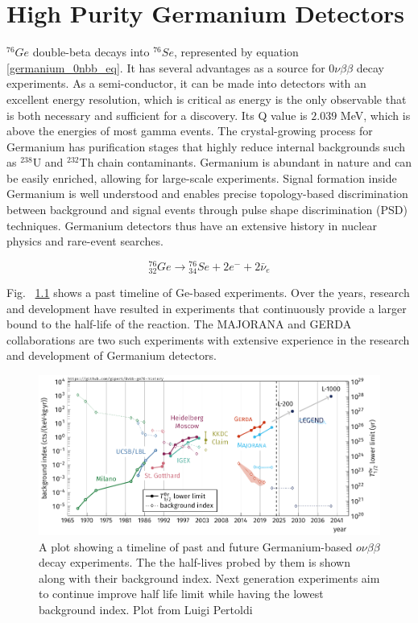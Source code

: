 \chapter{High Purity Germanium Detectors}
\label{chap:detectors}

${}^{76}Ge$ double-beta decays into ${}^{76}Se$, represented by equation \ref{germanium_0nbb_eq}. It has several advantages as a source for $0\nu\beta\beta$ decay experiments. As a semi-conductor, it can be made into detectors with an excellent energy resolution, which is critical as energy is the only observable that is both necessary and sufficient for a discovery. Its Q value is $2.039$ MeV, which is above the energies of most gamma events. The crystal-growing process for Germanium has purification stages that highly reduce internal backgrounds such as $^{238}$U and $^{232}$Th chain contaminants. Germanium is abundant in nature and can be easily enriched, allowing for large-scale experiments. Signal formation inside Germanium is well understood and enables precise topology-based discrimination between background and signal events through pulse shape discrimination (PSD) techniques. Germanium detectors thus have an extensive history in nuclear physics and rare-event searches.


\begin{equation}\label{germanium_0nbb_eq}
{}_{32}^{76}Ge \rightarrow {}_{34}^{76}Se + 2e^- + 2\bar{\nu}_e
\end{equation}

Fig. ~\ref{past_ge_exp} shows a past timeline of Ge-based experiments. Over the years, research and development have resulted in experiments that continuously provide a larger bound to the half-life of the reaction. The MAJORANA and GERDA collaborations are two such experiments with extensive experience in the research and development of Germanium detectors.

\begin{figure}[!htb]
\centering
\includegraphics[trim=0.1cm 0 0.1cm 0,clip, width=0.99\linewidth]{ch2/figs/0nbb-ge76-history-future.pdf}
\caption{A plot showing a timeline of past and future Germanium-based $o\nu\beta\beta$ decay experiments. The the half-lives probed by them is shown along with their background index. Next generation experiments aim to continue improve half life limit while having the lowest background index. Plot from Luigi Pertoldi}
\label{past_ge_exp}
\end{figure}


